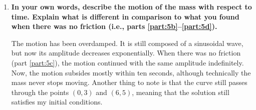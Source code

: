 \documentclass[11pt]{article}
\begin{document}
\begin{enumerate}[label={\textbf{\arabic*.}}]
{\begin{enumerate}[label={\textbf{(\alph*)}}, resume]
{                    \begin{align*}
                        x(6)=5&=e^{-0.657107(6)}(3\cos(0.261172(6))+C_2\sin(0.261172(6))) \\
                        &=0.0193967(0.0112990+C_2\cdot0.999993) \\
                        257.776&=0.0112990+C_2\cdot0.999993 \\
                        C_2\cdot0.999993&=257.765 \\
                        C_2&=257.767
                    \end{align*}
                    The resulting solution is therefore
                    \begin{equation*}
                        x=e^{-0.657107t}(3\cos(0.261172t)+257.767\sin(0.261172t))
                    \end{equation*}
                    \newpage
                    Sketching this solution, I get:
                    \begin{center}
                    \end{center}
                }
                \item{
                    \textbf{In your own words, describe the motion of the mass with respect to time. Explain what is different in comparison to what you found when there was no friction (i.e., parts \ref{part:5b}--\ref{part:5d}).}
                    \par
                    The motion has been overdamped. It is still composed of a sinusoidal wave, but now its amplitude decreases exponentially. When there was no friction (part \ref{part:5c}), the motion continued with the same amplitude indefinitely. Now, the motion subsides mostly within ten seconds, although technically the mass never stops moving. Another thing to note is that the curve still passes through the points $(0,3)$ and $(6,5)$, meaning that the solution still satisfies my initial conditions.
                }
            \end{enumerate}
        }
    \end{enumerate}
\end{document}
